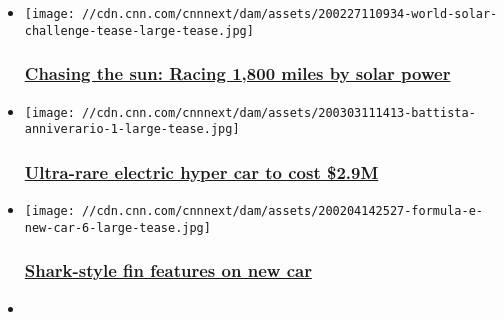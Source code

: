 \begin{itemize}
\item
  \href{/2020/03/04/motorsport/world-solar-challenge-race-solar-energy-supercharged-spt-intl/index.html}{}

  \texttt{[image: //cdn.cnn.com/cnnnext/dam/assets/200227110934-world-solar-challenge-tease-large-tease.jpg]}

  \hypertarget{chasing-the-sun-racing-1800-miles-by-solar-power}{%
  \subsubsection{\texorpdfstring{\href{/2020/03/04/motorsport/world-solar-challenge-race-solar-energy-supercharged-spt-intl/index.html}{Chasing
  the sun: Racing 1,800 miles by solar
  power}}{Chasing the sun: Racing 1,800 miles by solar power}}\label{chasing-the-sun-racing-1800-miles-by-solar-power}}
\item
  \href{/2020/03/03/motorsport/battista-anniversario-automobili-pininfarina-release-ev-spt-intl/index.html}{}

  \texttt{[image: //cdn.cnn.com/cnnnext/dam/assets/200303111413-battista-anniverario-1-large-tease.jpg]}

  \hypertarget{ultra-rare-electric-hyper-car-to-cost-29m}{%
  \subsubsection{\texorpdfstring{\href{/2020/03/03/motorsport/battista-anniversario-automobili-pininfarina-release-ev-spt-intl/index.html}{Ultra-rare
  electric hyper car to cost
  \$2.9M}}{Ultra-rare electric hyper car to cost \$2.9M}}\label{ultra-rare-electric-hyper-car-to-cost-29m}}
\item
  \href{/2020/02/04/motorsport/formula-e-new-car-design-spt-intl/index.html}{}

  \texttt{[image: //cdn.cnn.com/cnnnext/dam/assets/200204142527-formula-e-new-car-6-large-tease.jpg]}

  \hypertarget{shark-style-fin-features-on-new-car-}{%
  \subsubsection{\texorpdfstring{\href{/2020/02/04/motorsport/formula-e-new-car-design-spt-intl/index.html}{Shark-style
  fin features on new car
  }}{Shark-style fin features on new car }}\label{shark-style-fin-features-on-new-car-}}
\item
  \href{/2020/02/19/motorsport/drivers-eye-camera-formula-e-supercharged-spt-intl/index.html}{}


\end{itemize}
